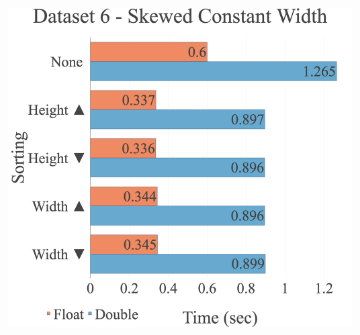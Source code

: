 \begin{figure}[H]
\begin{adjustwidth}{-2cm}{-2cm}
\begin{subfigure}{.62\textwidth}
\end{subfigure}
\par\bigskip
\par\bigskip
\centering
\begin{subfigure}{.62\textwidth}
  \includegraphics[width=1\textwidth]{img/experiments/multi-sorts-6_SKEWEDCONSTWIDTH.png}
\end{subfigure}
\end{adjustwidth}
\end{figure}


